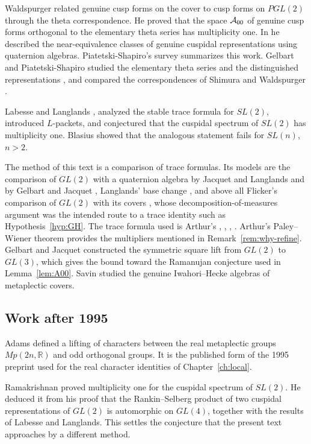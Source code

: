 \documentclass[12pt,letterpaper,openany]{book}
\theoremstyle{plain}
\theoremstyle{definition}
\theoremstyle{remark}
\theoremstyle{remark}
\begin{document}
Waldspurger \cite{Wa1} related genuine cusp forms on the cover to cusp
forms on $PGL(2)$ through the theta correspondence. He proved that the
space ${\cal A}_{00}$ of genuine cusp forms orthogonal to the elementary
theta series has multiplicity one. In \cite{Wa2} he described the
near-equivalence classes of genuine cuspidal representations using
quaternion algebras. Piatetski-Shapiro's survey \cite{PS} summarizes this
work. Gelbart and Piatetski-Shapiro studied the elementary theta series
and the distinguished representations \cite{GePS}, and compared the
correspondences of Shimura and Waldspurger \cite{GPS}.

Labesse and Langlands \cite{LL}, \cite{Lab} analyzed the stable trace
formula for $SL(2)$, introduced $L$-packets, and conjectured that the
cuspidal spectrum of $SL(2)$ has multiplicity one. Blasius \cite{Blas}
showed that the analogous statement fails for $SL(n)$, $n>2$.

The method of this text is a comparison of trace formulas. Its models are
the comparison of $GL(2)$ with a quaternion algebra by Jacquet and
Langlands \cite{JL} and by Gelbart and Jacquet \cite{GJ}, Langlands' base
change \cite{L4}, and above all Flicker's comparison of $GL(2)$ with its
covers \cite{Fl}, whose decomposition-of-measures argument was the intended
route to a trace identity such as Hypothesis~\ref{hyp:GH}. The trace formula used is Arthur's
\cite{A2}, \cite{A3}, \cite{A6}, \cite{A7}. Arthur's Paley--Wiener theorem
\cite{APW} provides the multipliers mentioned in
Remark~\ref{rem:why-refine}. Gelbart and Jacquet \cite{GJ78} constructed
the symmetric square lift from $GL(2)$ to $GL(3)$, which gives the bound
toward the Ramanujan conjecture used in Lemma~\ref{lem:A00}. Savin
\cite{Sav} studied the genuine Iwahori--Hecke algebras of metaplectic
covers.

\subsection*{Work after 1995}

Adams \cite{Ad2} defined a lifting of characters between the real
metaplectic groups $Mp(2n,{\mathbb R})$ and odd orthogonal groups. It is
the published form of the 1995 preprint used for the real character
identities of Chapter~\ref{ch:local}.

Ramakrishnan \cite{Ra} proved multiplicity one for the cuspidal spectrum
of $SL(2)$. He deduced it from his proof that the Rankin--Selberg product
of two cuspidal representations of $GL(2)$ is automorphic on $GL(4)$,
together with the results of Labesse and Langlands. This settles the
conjecture that the present text approaches by a different method.
\end{document}
